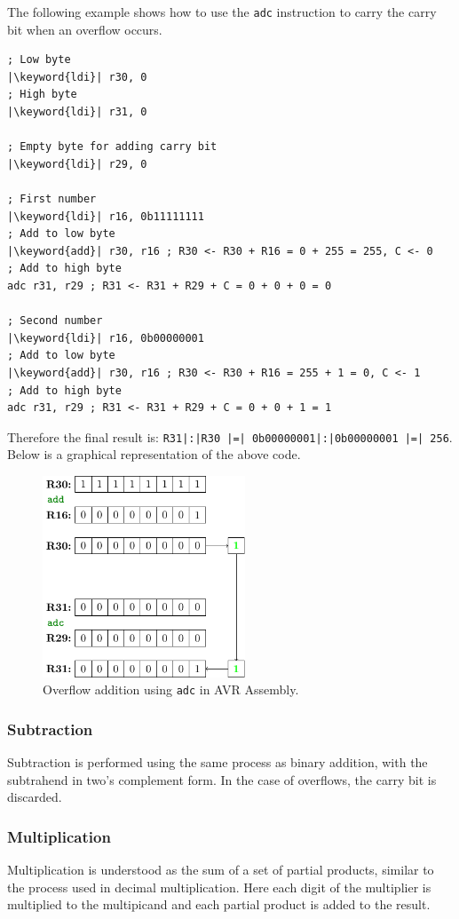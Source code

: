 \documentclass{article}
\newcommand{\keyword}[1]{\textcolor[rgb]{0.00,0.50,0.00}{\textbf{#1}}}
\begin{document}
The following example shows how to use the \texttt{adc} instruction to carry the carry bit when an overflow occurs.
\begin{verbatim}
; Low byte
|\keyword{ldi}| r30, 0
; High byte
|\keyword{ldi}| r31, 0

; Empty byte for adding carry bit
|\keyword{ldi}| r29, 0

; First number
|\keyword{ldi}| r16, 0b11111111
; Add to low byte
|\keyword{add}| r30, r16 ; R30 <- R30 + R16 = 0 + 255 = 255, C <- 0
; Add to high byte
adc r31, r29 ; R31 <- R31 + R29 + C = 0 + 0 + 0 = 0

; Second number
|\keyword{ldi}| r16, 0b00000001
; Add to low byte
|\keyword{add}| r30, r16 ; R30 <- R30 + R16 = 255 + 1 = 0, C <- 1
; Add to high byte
adc r31, r29 ; R31 <- R31 + R29 + C = 0 + 0 + 1 = 1
\end{verbatim}
Therefore the final result is: \texttt{R31|:|R30 |=| 0b00000001|:|0b00000001 |=| 256}.
Below is a graphical representation of the above code.
\begin{figure}[H]
    \centering
    \includegraphics[height = 6cm, keepaspectratio = true]{figures/adc.pdf}
    \caption{Overflow addition using \texttt{adc} in AVR Assembly.} %
\end{figure}
\subsubsection{Subtraction}
Subtraction is performed using the same process as binary addition, with the
subtrahend in two's complement form.
In the case of overflows, the carry bit is discarded.
\subsubsection{Multiplication}
Multiplication is understood as the sum of a set of partial products, similar to the process used in decimal multiplication.
Here each digit of the multiplier is multiplied to the multipicand and each partial product is added to the result.
\end{document}
